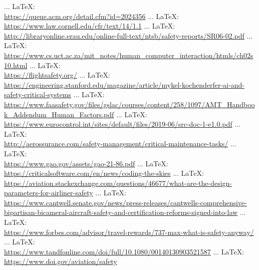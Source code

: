 \begin{thebibliography}{99}
{{{{{{{						 ... \LaTeX:\\ \url{https://queue.acm.org/detail.cfm?id=2024356}
						 ... \LaTeX:\\ \url{https://www.law.cornell.edu/cfr/text/14/1.1}
						 ... \LaTeX:\\ \url{http://libraryonline.erau.edu/online-full-text/ntsb/safety-reports/SR06-02.pdf}
						 ... \LaTeX:\\ \url{https://www.cs.uct.ac.za/mit_notes/human_computer_interaction/htmls/ch02s10.html}
						 ... \LaTeX:\\ \url{https://flightsafety.org/}
						 ... \LaTeX:\\ \url{https://engineering.stanford.edu/magazine/article/mykel-kochenderfer-ai-and-safety-critical-systems}
						 ... \LaTeX:\\ \url{https://www.faasafety.gov/files/gslac/courses/content/258/1097/AMT_Handbook_Addendum_Human_Factors.pdf}
						 ... \LaTeX:\\ \url{https://www.eurocontrol.int/sites/default/files/2019-06/src-doc-1-e1.0.pdf}
						 ... \LaTeX:\\ \url{http://aerossurance.com/safety-management/critical-maintenance-tasks/}
						 ... \LaTeX:\\ \url{https://www.gao.gov/assets/gao-21-86.pdf}
						 ... \LaTeX:\\ \url{https://criticalsoftware.com/en/news/coding-the-skies}
						 ... \LaTeX:\\ \url{https://aviation.stackexchange.com/questions/46677/what-are-the-design-parameters-for-airliner-safety}
						 ... \LaTeX:\\ \url{https://www.cantwell.senate.gov/news/press-releases/cantwells-comprehensive-bipartisan-bicameral-aircraft-safety-and-certification-reforms-signed-into-law}
						 ... \LaTeX:\\ \url{https://www.forbes.com/advisor/travel-rewards/737-max-what-is-safety-anyway/}
						 ... \LaTeX:\\ \url{https://www.tandfonline.com/doi/full/10.1080/00140130903521587}
						 ... \LaTeX:\\ \url{https://www.doi.gov/aviation/safety}
}}}}}}}
\end{thebibliography}
